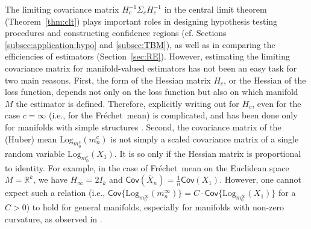 \documentclass[preprint]{imsart}
\def\Frechet{Fr\'{e}chet}
\theoremstyle{plain}
\theoremstyle{remark}
\begin{document}
The limiting covariance matrix $H_c^{-1}\Sigma_{c}H_c^{-1}$ in the central limit theorem (Theorem~\ref{thm:clt}) plays important roles in designing hypothesis testing procedures and constructing confidence regions (cf. Sections \ref{subsec:application:hypo} and \ref{subsec:TBM}), as well as in comparing the efficiencies of estimators (Section~\ref{sec:RE}). However, estimating the limiting covariance matrix for manifold-valued estimators has not been an easy task for two main reasons. First, the form of the Hessian matrix $H_c$, or the Hessian of the loss function, depends not only on the loss function but also on which manifold $M$ the estimator is defined. Therefore, explicitly writing out for $H_c$, even for the case $c  =\infty$ (i.e., for the \Frechet\ mean) is complicated, and has been done only for manifolds with simple structures \citep{pennec2018barycentric}. 
Second, the covariance matrix of the (Huber) mean $\mbox{Log}_{m_0^c}(m_n^c)$ is not simply a scaled covariance matrix of a single random variable $\mbox{Log}_{m_0^c}(X_1)$. It is so only if the Hessian matrix is proportional to identity. For example, in the case of \Frechet\ mean on the Euclidean space $M = \mathbb{R}^k$, we have $H_\infty = 2I_k$ and $\textsf{Cov}(\bar{X}_n) = \tfrac{1}{n}\textsf{Cov}(X_1)$. %
However, one cannot expect such a relation (i.e., $\textsf{Cov}\{\mbox{Log}_{m_0^\infty}(m_n^\infty)\} = C \cdot \textsf{Cov}\{\mbox{Log}_{m_0^\infty}(X_1)\}$ for a $C>0$) to hold for general manifolds, especially for manifolds with non-zero curvature, as observed in \cite{pennec2019curvature}.

%


\end{document}
